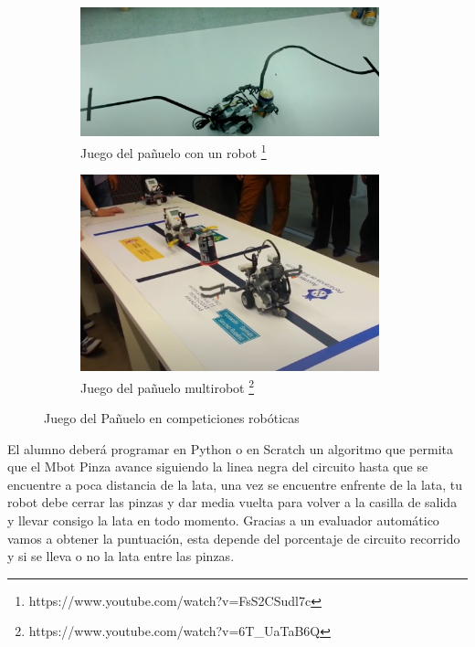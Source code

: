\begin{figure}[H]
  \begin{subfigure}[b]{0.5\textwidth}
  \centering
    \includegraphics[width=0.95\textwidth, height=0.4\textwidth]{chapters/images/jp.png}
    \caption{Juego del pañuelo con un robot \footnote{https://www.youtube.com/watch?v=FsS2CSudl7c}}
    \label{fig:f1}
  \end{subfigure}
  \hfill
  \begin{subfigure}[b]{0.5\textwidth}
  \centering
    \includegraphics[width=0.95\textwidth, height=0.4\textwidth]{chapters/images/jp2.png}
    \caption{Juego del pañuelo multirobot \footnote{https://www.youtube.com/watch?v=6T\_Ua\-TaB6Q}}
    \label{fig:f2}
  \end{subfigure}
  \caption{Juego del Pañuelo en competiciones robóticas}

\end{figure}

 
El alumno deberá programar en Python o en Scratch un algoritmo que permita que el Mbot Pinza avance siguiendo la linea negra del circuito hasta que se encuentre a poca distancia de la lata, una vez se encuentre enfrente de la lata, tu robot debe cerrar las pinzas y dar media vuelta para volver a la casilla de salida y  llevar consigo la lata en todo momento. Gracias a un evaluador automático vamos a obtener la puntuación, esta depende del porcentaje de circuito recorrido y si se lleva o no la lata entre las pinzas.

